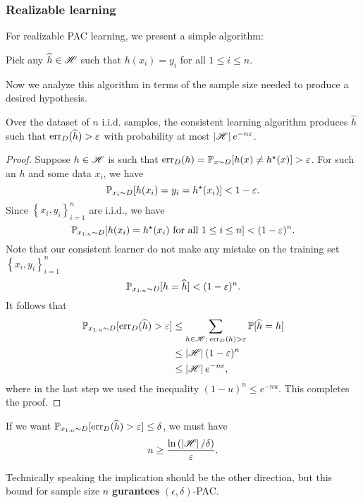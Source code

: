 \documentclass[a4paper]{article}
\begin{document}
\subsubsection{Realizable learning}

For realizable PAC learning, we present a simple algorithm:
\begin{algorithm}
Pick any $\widehat{h} \in \mathscr{H}$ such that $h(x_i) = y_i$ 
for all $1 \leq i \leq n$.
\end{algorithm}
Now we analyze this algorithm in terms of the sample size needed 
to produce a desired hypothesis.

\begin{thm}
  Over the dataset of $n$ i.i.d. samples,
  the consistent learning algorithm produces $\hat{h}$ such 
  that $\operatorname{err}_D(\widehat{h}) > \varepsilon$ with probability
  at most $\left\lvert \mathscr{H}\right\rvert e^{-n\varepsilon}$. 
\end{thm}
\begin{proof}
  Suppose $h \in \mathscr{H}$ is such that 
  $\operatorname{err}_D(h) = \mathbb{P}_{x \sim D} [h(x) \neq h^\star(x)] > \varepsilon$.
  For such an $h$ and some data $x_i$, we have 
  \[
  \mathbb{P}_{x_i \sim D} [h(x_i) = y_i = h^\star(x_i)] < 1 - \varepsilon.
  \]
  Since $\left\{ x_i, y_i \right\}_{i=1}^n$ are i.i.d., we have 
  \[
  \mathbb{P}_{x_{1:n} \sim D}[h(x_i) = h^\star(x_i) \text{ for all 
  $1 \leq i \leq n$}] < (1 - \varepsilon)^n.
  \]
  Note that our consistent learner do not make any mistake 
  on the training set $\left\{ x_i, y_i \right\}_{i=1}^n$
  \[
  \mathbb{P}_{x_{1 : n} \sim D} [h = \widehat{h}] < (1 - \varepsilon)^n.
  \]
  It follows that 
  \[
  \begin{aligned}
    \mathbb{P}_{x_{1 : n} \sim D} [\operatorname{err}_D (\widehat{h}) > \varepsilon] 
    & \leq \sum_{h \in \mathscr{H}: \; \operatorname{err}_D(h) > \varepsilon} 
    \mathbb{P}[\widehat{h} = h]  \\
    & \leq \left\lvert \mathscr{H}\right\rvert (1 - \varepsilon)^n \\
    & \leq \left\lvert \mathscr{H}\right\rvert e^{-n\varepsilon},
  \end{aligned}
  \]
  where in the last step we used the inequality 
  $(1 - u)^n \leq e^{-nu}$. This completes the proof.
\end{proof}

\begin{cor}
  If we want $\mathbb{P}_{x_{1 : n} \sim D} [\operatorname{err}_D (\widehat{h}) > \varepsilon]
  \leq \delta$, we must have 
  \[
  n \geq \frac{\ln \left( \left\lvert \mathscr{H}\right\rvert / \delta \right)}{\varepsilon}.
  \]
\end{cor}
Technically speaking the implication should be the other direction, 
but this bound for sample size $n$ 
\textbf{gurantees} $(\epsilon, \delta)$-PAC.
\end{document}
